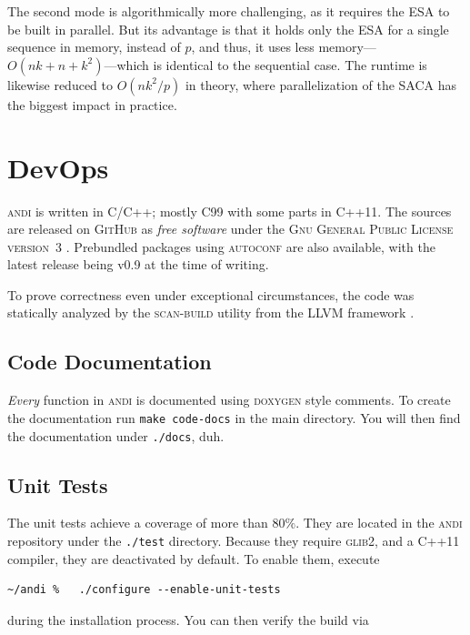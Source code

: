 \documentclass[a4paper,
  10pt,
  english,
  DIV=12,
  BCOR=8mm]{scrbook}
\newcommand{\algo}[1]{\textsc{{#1}}}
\newcommand{\andi}{\algo{andi} }
\newcommand{\todo}[1]{
  \marginpar{\fbox{\begin{minipage}{0.9\marginparwidth}
  \scriptsize\sloppy\raggedright #1
  \end{minipage}}}
}
\begin{document}
The second mode is algorithmically more challenging, as it requires the \ac{ESA} to be built in parallel. But its advantage is that it holds only the \ac{ESA} for a single sequence in memory, instead of $p$, and thus, it uses less memory---$O(nk + n + k^2)$---which is identical to the sequential case. The runtime is likewise reduced to $O(nk^2/p)$ in theory, where parallelization of the \ac{SACA} has the biggest impact in practice.



\todo{more copy\&paste}

\chapter{DevOps} %


\andi is written in C/C++; mostly C99 with some parts in C++11. The sources are released on \algo{GitHub} as \emph{free software} under the \textsc{Gnu General Public License version~3} \cite{GPL}. Prebundled packages using \algo{autoconf} are also available, with the latest release being {v0.9} at the time of writing.

To prove correctness even under exceptional circumstances, the code was statically analyzed by the \algo{scan-build} utility from the \algo{LLVM} framework \cite{LLVM}. 

\section{Code Documentation}

\emph{Every} function in \andi is documented using \algo{doxygen} style comments. To create the documentation run \lstinline$make code-docs$ in the main directory. You will then find the documentation under \lstinline$./docs$, duh.


\section{Unit Tests}

The unit tests achieve a coverage of more than $80\%$. They are located in the \andi repository under the \lstinline$./test$ directory. Because they require \algo{glib2}, and a C++11 compiler, they are deactivated by default. To enable them, execute

\begin{lstlisting}
~/andi %   ./configure --enable-unit-tests
\end{lstlisting}

\noindent during the installation process. You can then verify the build via 
\end{document}
